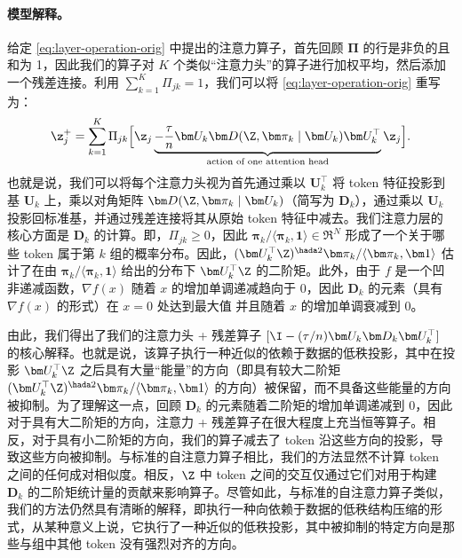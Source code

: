 \documentclass[../../book-main_zh.tex]{subfiles}
\begin{document}
\paragraph{模型解释。} 给定 \eqref{eq:layer-operation-orig} 中提出的注意力算子，首先回顾 $\bm\Pi$ 的行是非负的且和为 1，因此我们的算子对 $K$ 个类似“注意力头”的算子进行加权平均，然后添加一个残差连接。利用 \(\sum_{k = 1}^{K}\Pi_{jk} = 1\)，我们可以将 \eqref{eq:layer-operation-orig} 重写为： %
\vspace{-2mm}
\begin{equation}
    \label{eq:z_up}
    \z_j^+ = \sum_{k=1}^K \Pi_{jk} \Big[ \z_j \underbrace{-
            \frac{\tau}{n} \bm U_{k} \bm D(\Z, \bm \pi_{k} \mid \bm U_{k})
    \bm U_{k}^{\top}}_{\text{action of one attention head}} \z_j \Big].
\end{equation}
也就是说，我们可以将每个注意力头视为首先通过乘以 $\bm U_k^\top$ 将 token 特征投影到基 $\bm U_{k}$ 上，乘以对角矩阵 $\bm D(\Z, \bm \pi_{k} \mid \bm U_{k})$（简写为 \(\bm
D_{k}\)），通过乘以 $\bm U_{k}$ 投影回标准基，并通过残差连接将其从原始 token 特征中减去。我们注意力层的核心方面是 $\bm D_{k}$ 的计算。即，\(\Pi_{jk} \geq 0\)，因此 $\bm \pi_k / \langle \bm \pi_{k}, \bm
1\rangle \in \Re^N$ 形成了一个关于哪些 token 属于第 $k$ 组的概率分布。因此，$(\bm U^\top_k \Z)^{\hada 2}
\bm \pi_k / \langle \bm \pi_{k}, \bm 1\rangle$ 估计了在由 $\bm
\pi_k /  \langle \bm \pi_{k}, \bm 1\rangle$ 给出的分布下 $\bm U_k^\top \Z$ 的二阶矩。此外，由于 $f$ 是一个凹非递减函数，$\nabla f(x)$ 随着 $x$ 的增加单调递减趋向于 $0$，因此 $\bm D_{k}$ 的元素（具有 $\nabla f(x)$ 的形式）在 $x=0$ 处达到最大值 %
并且随着 $x$ 的增加单调衰减到 $0$。

由此，我们得出了我们的注意力头 + 残差算子 $[\I - (\tau/n)\bm U_{k}\bm D_{k}\bm U_{k}^{\top}]$ 的核心解释。也就是说，该算子执行一种近似的依赖于数据的低秩投影，其中在投影 $\bm
U_k^\top \Z$ 之后具有大量“能量”的方向（即具有较大二阶矩 $(\bm
    U_{k}^{\top}\Z)^{\hada 2}\bm \pi_k / \langle \bm \pi_{k}, \bm
1\rangle$ 的方向）被保留，而不具备这些能量的方向被抑制。为了理解这一点，回顾 $\bm D_k$ 的元素随着二阶矩的增加单调递减到 0，因此对于具有大二阶矩的方向，注意力 + 残差算子在很大程度上充当恒等算子。相反，对于具有小二阶矩的方向，我们的算子减去了 token 沿这些方向的投影，导致这些方向被抑制。与标准的自注意力算子相比，我们的方法显然不计算 token 之间的任何成对相似度。相反，$\Z$ 中 token 之间的交互仅通过它们对用于构建 $\bm D_{k}$ 的二阶矩统计量的贡献来影响算子。尽管如此，与标准的自注意力算子类似，我们的方法仍然具有清晰的解释，即执行一种向依赖于数据的低秩结构压缩的形式，从某种意义上说，它执行了一种近似的低秩投影，其中被抑制的特定方向是那些与组中其他 token 没有强烈对齐的方向。
\end{document}
